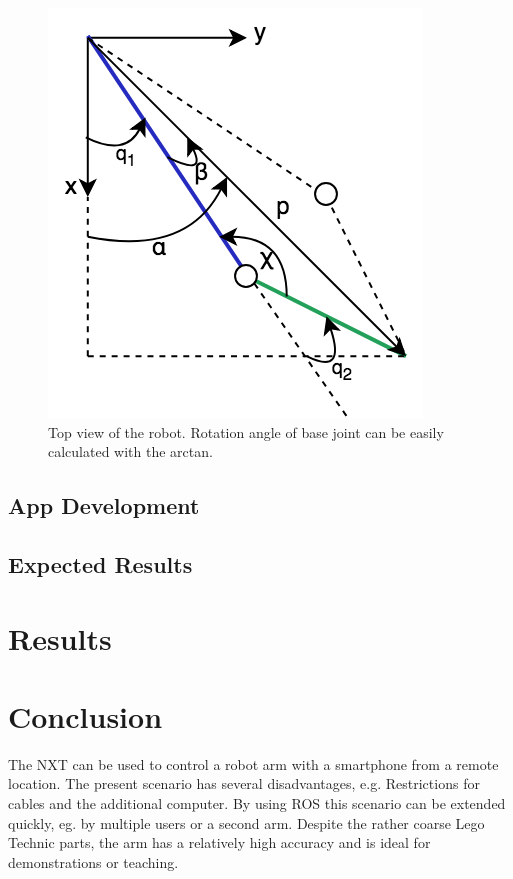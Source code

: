 \documentclass[conference]{IEEEtran}
\begin{document}
\begin{figure}[htbp]
	\centerline{\includegraphics[scale=0.3]{img/kin_q1_q2.png}}
	\caption{Top view of the robot. Rotation angle of base joint can be easily calculated with the arctan.}
	\label{fig:q1_q2_calc}
\end{figure}

\subsection{App Development}\label{sec:development}

\subsection{Expected Results}\label{sec:expectedresults}

\section{Results}

\section{Conclusion}
The NXT can be used to control a robot arm with a smartphone from a remote location. The present scenario has several disadvantages, e.g. Restrictions for cables and the additional computer.
By using ROS this scenario can be extended quickly, eg. by multiple users or a second arm. Despite the rather coarse Lego Technic parts, the arm has a relatively high accuracy and is ideal for demonstrations or teaching.
\end{document}
